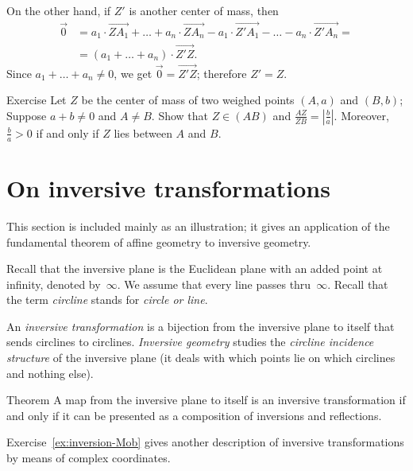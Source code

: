 On the other hand, if $Z'$ is another center of mass, then 
\begin{align*}\overrightarrow0
&=
a_1\cdot \overrightarrow{ZA_1}+\dots+a_n\cdot \overrightarrow{ZA_n}
-a_1\cdot \overrightarrow{Z'A_1}-\dots-a_n\cdot \overrightarrow{Z'A_n}=
\\
&=(a_1+\dots+a_n)\cdot \overrightarrow{Z'Z}.
\end{align*}
Since $a_1+\dots+a_n\ne0$, we get $\overrightarrow0=\overrightarrow{Z'Z}$;
therefore $Z'=Z$.
\qeds

\begin{thm}{Exercise}
Let $Z$ be the center of mass of two weighed points $(A,a)$ and $(B,b)$;
Suppose $a+b\ne0$ and $A\ne B$.
Show that $Z\in (AB)$ and $\tfrac{AZ}{ZB}=|\tfrac ba|$.
Moreover, $\tfrac ba>0$ if and only if $Z$ lies between $A$ and $B$.
\end{thm}







\section{On inversive transformations}

This section is included mainly as an illustration;
it gives an application of the fundamental theorem of affine geometry to inversive geometry.

Recall that the inversive plane is the Euclidean plane with an added point at infinity, denoted by~$\infty$.
We assume that every line passes thru~$\infty$.
Recall that the term {}\emph{circline} stands for \textit{circle or line}.

An \emph{inversive transformation} is a bijection from the inversive plane to itself that sends circlines to circlines.
{}\emph{Inversive geometry} studies the {}\emph{circline incidence structure} of the inversive plane
(it deals with which points lie on which circlines and nothing else).

\begin{thm}{Theorem}\label{thm:inversions-inversive}
A map from the inversive plane to itself is an inversive transformation
if and only if it can be presented as a composition of inversions and reflections.  
\end{thm}

Exercise~\ref{ex:inversion-Mob} gives another description of inversive transformations by means of complex coordinates.

